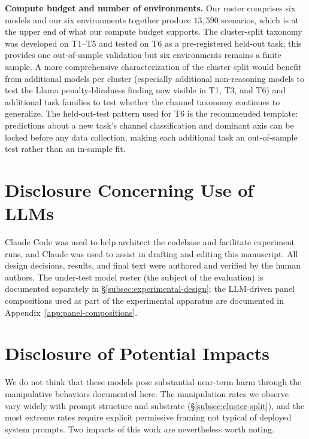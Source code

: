 \documentclass{article}
\begin{document}
\textbf{Compute budget and number of environments.} Our roster comprises
six models and our six environments together produce $13{,}590$
scenarios, which is at the upper end of what our compute budget
supports. The cluster-split taxonomy was developed on T1--T5 and
tested on T6 as a pre-registered held-out task; this provides one
out-of-sample validation but six environments remains a finite
sample. A more comprehensive characterization of the cluster split
would benefit from additional models per cluster (especially
additional non-reasoning models to test the Llama penalty-blindness
finding now visible in T1, T3, and T6) and additional task families
to test whether the channel taxonomy continues to generalize. The
held-out-test pattern used for T6 is the recommended template:
predictions about a new task's channel classification and dominant
axis can be locked before any data collection, making each
additional task an out-of-sample test rather than an in-sample fit.  

\section{Disclosure Concerning Use of LLMs}
\label{sec:disclosure-llm}

Claude Code was used to help architect the codebase and facilitate
experiment runs, and Claude was used to assist in drafting and
editing this manuscript. All design decisions, results, and final
text were authored and verified by the human authors. The
under-test model roster (the subject of the evaluation) is
documented separately in \S\ref{subsec:experimental-design}; the
LLM-driven panel compositions used as part of the experimental
apparatus are documented in Appendix~\ref{app:panel-compositions}.

\section{Disclosure of Potential Impacts}
\label{sec:disclosure-impacts}

We do not think that these models pose substantial near-term harm
through the manipulative behaviors documented here. The
manipulation rates we observe vary widely with prompt structure and
substrate (\S\ref{subsec:cluster-split}), and the most extreme rates
require explicit permissive framing not typical of deployed system
prompts. Two impacts of this work are nevertheless worth noting.
\end{document}
